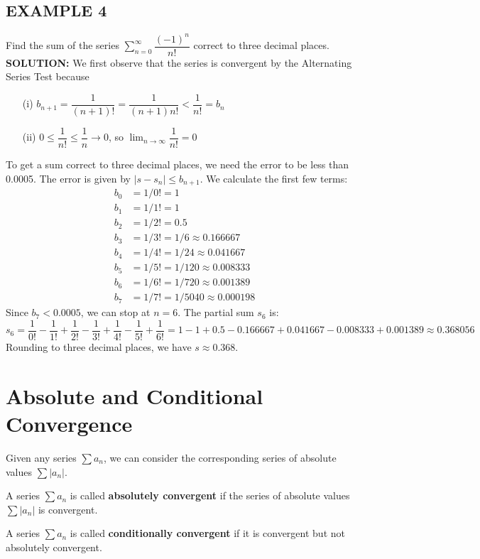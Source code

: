 \documentclass{article}
\theoremstyle{mystyle}
\begin{document}
\subsection*{EXAMPLE 4}
Find the sum of the series \( \sum_{n=0}^{\infty} \dfrac{(-1)^n}{n!} \) correct to three decimal places.\\
\textbf{SOLUTION:}
We first observe that the series is convergent by the Alternating Series Test because
\begin{itemize}
    \item[(i)] \(b_{n+1} = \dfrac{1}{(n+1)!} = \dfrac{1}{(n+1)n!} < \dfrac{1}{n!} = b_n\)
    \item[(ii)] \(0 \le \dfrac{1}{n!} \le \dfrac{1}{n} \to 0\), so \( \lim_{n\to\infty} \dfrac{1}{n!} = 0 \)
\end{itemize}
To get a sum correct to three decimal places, we need the error to be less than 0.0005. The error is given by \(|s - s_n| \le b_{n+1}\).
We calculate the first few terms:
\begin{align*}
    b_0 &= 1/0! = 1 \\
    b_1 &= 1/1! = 1 \\
    b_2 &= 1/2! = 0.5 \\
    b_3 &= 1/3! = 1/6 \approx 0.166667 \\
    b_4 &= 1/4! = 1/24 \approx 0.041667 \\
    b_5 &= 1/5! = 1/120 \approx 0.008333 \\
    b_6 &= 1/6! = 1/720 \approx 0.001389 \\
    b_7 &= 1/7! = 1/5040 \approx 0.000198
\end{align*}
Since \(b_7 < 0.0005\), we can stop at \(n=6\). The partial sum \(s_6\) is:
\[ s_6 = \frac{1}{0!} - \frac{1}{1!} + \frac{1}{2!} - \frac{1}{3!} + \frac{1}{4!} - \frac{1}{5!} + \frac{1}{6!} = 1 - 1 + 0.5 - 0.166667 + 0.041667 - 0.008333 + 0.001389 \approx 0.368056 \]
Rounding to three decimal places, we have \(s \approx 0.368\).

\section*{Absolute and Conditional Convergence}
Given any series \( \sum a_n \), we can consider the corresponding series of absolute values \( \sum |a_n| \).

\begin{tcolorbox}[
    colback=white,
    colframe=orange!80!white,
    title=Definition of Absolute and Conditional Convergence,
    boxrule=0.5mm,
    arc=3mm
    ]
    A series \( \sum a_n \) is called \textbf{absolutely convergent} if the series of absolute values \( \sum |a_n| \) is convergent.
    
    \vspace{1em}
    
    A series \( \sum a_n \) is called \textbf{conditionally convergent} if it is convergent but not absolutely convergent.
\end{tcolorbox}
\end{document}
